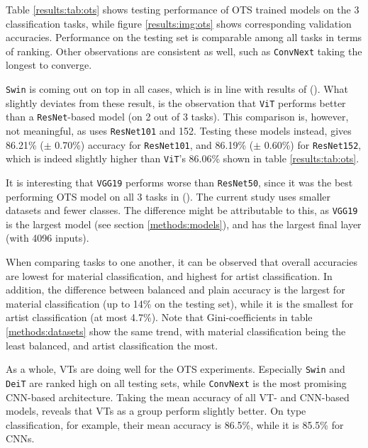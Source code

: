 Table \ref{results:tab:ots} shows testing performance of OTS trained models on the 3 classification tasks, while figure \ref{results:img:ots} shows corresponding validation accuracies. Performance on the testing set is comparable among all tasks in terms of ranking. Other observations are consistent as well, such as \texttt{ConvNext} taking the longest to converge.

\texttt{Swin} is coming out on top in all cases, which is in line with results of \citeauthor{zhou2021convnets} (\citeyear{zhou2021convnets}). What slightly deviates from these result, is the observation that \texttt{ViT} performs better than a \texttt{ResNet}-based model (on 2 out of 3 tasks). This comparison is, however, not meaningful, as \citeauthor{zhou2021convnets} uses \texttt{ResNet101} and 152. Testing these models instead, gives 86.21\% ($\pm$ 0.70\%) accuracy for \texttt{ResNet101}, and 86.19\% ($\pm$ 0.60\%) for \texttt{ResNet152}, which is indeed slightly higher than \texttt{ViT}'s 86.06\% shown in table \ref{results:tab:ots}.

It is interesting that \texttt{VGG19} performs worse than \texttt{ResNet50}, since it was the best performing OTS model on all 3 tasks in \citeauthor{sabatelli2018deep} (\citeyear{sabatelli2018deep}). The current study uses smaller datasets and fewer classes. The difference might be attributable to this, as \texttt{VGG19} is the largest model (see section \ref{methods:models}), and has the largest final layer (with 4096 inputs).

When comparing tasks to one another, it can be observed that overall accuracies are lowest for material classification, and highest for artist classification. In addition, the difference between balanced and plain accuracy is the largest for material classification (up to 14\% on the testing set), while it is the smallest for artist classification (at most 4.7\%). Note that Gini-coefficients in table \ref{methods:datasets} show the same trend, with material classification being the least balanced, and artist classification the most.

As a whole, VTs are doing well for the OTS experiments. Especially \texttt{Swin} and \texttt{DeiT} are ranked high on all testing sets, while \texttt{ConvNext} is the most promising CNN-based architecture. Taking the mean accuracy of all VT- and CNN-based models, reveals that VTs as a group perform slightly better. On type classification, for example, their mean accuracy is 86.5\%, while it is 85.5\% for CNNs.

